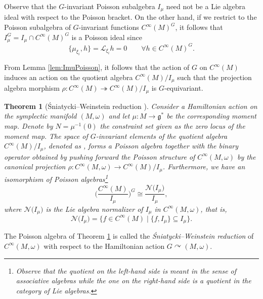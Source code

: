 \documentclass[pdftex]{sigma}
\numberwithin{equation}{section}
\newtheorem{Theorem}{Theorem}[section]
\DeclareMathOperator{\action}{\curvearrowright}
\newcommand{\g}{\mathfrak{g}}
\renewcommand{\L}{\mathscr{L}}
\renewcommand{\subset}{\subseteq}
\begin{document}
\begin{Remark}
	Observe that the $G$-invariant Poisson subalgebra $I_\mu$ need not be a Lie algebra ideal with respect to the Poisson bracket.
	On the other hand, if we restrict to the Poisson subalgebra of $G$-invariant functions $C^\infty(M)^G$, it follows that $I_{\mu}^G = I_\mu \cap C^\infty(M)^G$ is a Poisson ideal since
	\[
		\bigl\lbrace	\mu_{\xi_i} , h \bigr\rbrace = \L_{\xi_i} h = 0
		\qquad \forall h \in C^\infty(M)^G.
	\]
\end{Remark}

From Lemma \ref{lem:ImuPoisson}, it follows that the action of $G$ on $C^\infty(M)$ induces an action on the quotient algebra $C^\infty(M)/I_\mu$ such that the projection algebra morphism $\rho\colon  C^\infty(M) \twoheadrightarrow C^\infty(M)/I_{\mu}$ is $G$-equivariant.

\begin{Theorem}[\'Sniatycki--Weinstein reduction \cite{SniatyckiWeinstein83}]\label{thm:SW-red}
 Consider a Hamiltonian action on the symplectic manifold $(M,\omega)$ and let $\mu\colon M\to\g^*$ be the corresponding moment map.
 Denote by $N=\mu^{-1}(0)$ the constraint set given as the zero locus of the moment map.
 The space of $G$-invariant elements of the quotient algebra $C^\infty(M)/I_\mu$, denoted as ,
 forms a Poisson algebra together with the binary operator obtained by pushing forward the Poisson structure of $C^\infty(M,\omega)$ by the canonical projection $\rho\colon  C^\infty(M,\omega) \to C^\infty(M)/I_\mu$.
	Furthermore, we have an isomorphism of Poisson algebras\footnote{Observe that the quotient on the left-hand side is meant in the sense of associative algebras while the one on the right-hand side is a quotient in the category of Lie algebras.}
	\begin{displaymath}
		\biggl(\frac{C^\infty(M)}{I_{\mu}}\biggr)^G \cong
		\frac{\mathcal{N}\bigl(I_\mu\bigr)}{I_\mu},
	\end{displaymath}
	where $\mathcal{N}\bigl(I_\mu\bigr)$ is the Lie algebra normalizer of $I_\mu$ in $C^\infty(M,\omega)$, that is,
	\begin{equation}\label{eq:ImuNorm}
		\mathcal{N}\bigl(I_\mu\bigr) =
		\bigl\lbrace
 		f \in C^\infty(M)
 		\mid
		\bigl\lbrace f, I_\mu \bigr\rbrace \subset I_\mu
 		\bigr\rbrace 		.
	\end{equation}
\end{Theorem}

\begin{Definition}
	The Poisson algebra  of Theorem \ref{thm:SW-red} is called the \emph{\'Sniatycki--Weinstein reduction} of $C^\infty(M,\omega)$ with respect to the Hamiltonian action $G\action (M,\omega)$.
\end{Definition}
\end{document}
